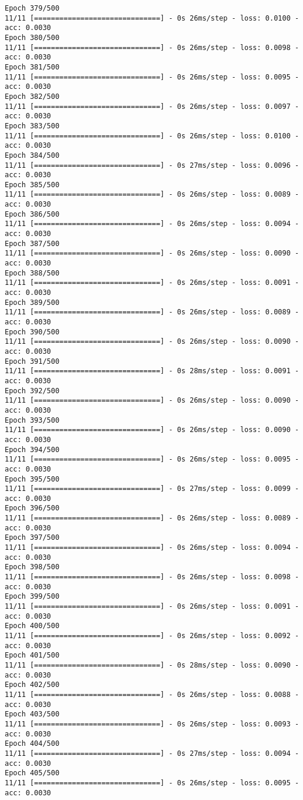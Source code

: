 \documentclass[11pt]{article}
\begin{document}
\begin{Verbatim}[commandchars=\\\{\}]
Epoch 379/500
11/11 [==============================] - 0s 26ms/step - loss: 0.0100 - acc: 0.0030
Epoch 380/500
11/11 [==============================] - 0s 26ms/step - loss: 0.0098 - acc: 0.0030
Epoch 381/500
11/11 [==============================] - 0s 26ms/step - loss: 0.0095 - acc: 0.0030
Epoch 382/500
11/11 [==============================] - 0s 26ms/step - loss: 0.0097 - acc: 0.0030
Epoch 383/500
11/11 [==============================] - 0s 26ms/step - loss: 0.0100 - acc: 0.0030
Epoch 384/500
11/11 [==============================] - 0s 27ms/step - loss: 0.0096 - acc: 0.0030
Epoch 385/500
11/11 [==============================] - 0s 26ms/step - loss: 0.0089 - acc: 0.0030
Epoch 386/500
11/11 [==============================] - 0s 26ms/step - loss: 0.0094 - acc: 0.0030
Epoch 387/500
11/11 [==============================] - 0s 26ms/step - loss: 0.0090 - acc: 0.0030
Epoch 388/500
11/11 [==============================] - 0s 26ms/step - loss: 0.0091 - acc: 0.0030
Epoch 389/500
11/11 [==============================] - 0s 26ms/step - loss: 0.0089 - acc: 0.0030
Epoch 390/500
11/11 [==============================] - 0s 26ms/step - loss: 0.0090 - acc: 0.0030
Epoch 391/500
11/11 [==============================] - 0s 28ms/step - loss: 0.0091 - acc: 0.0030
Epoch 392/500
11/11 [==============================] - 0s 26ms/step - loss: 0.0090 - acc: 0.0030
Epoch 393/500
11/11 [==============================] - 0s 26ms/step - loss: 0.0090 - acc: 0.0030
Epoch 394/500
11/11 [==============================] - 0s 26ms/step - loss: 0.0095 - acc: 0.0030
Epoch 395/500
11/11 [==============================] - 0s 27ms/step - loss: 0.0099 - acc: 0.0030
Epoch 396/500
11/11 [==============================] - 0s 26ms/step - loss: 0.0089 - acc: 0.0030
Epoch 397/500
11/11 [==============================] - 0s 26ms/step - loss: 0.0094 - acc: 0.0030
Epoch 398/500
11/11 [==============================] - 0s 26ms/step - loss: 0.0098 - acc: 0.0030
Epoch 399/500
11/11 [==============================] - 0s 26ms/step - loss: 0.0091 - acc: 0.0030
Epoch 400/500
11/11 [==============================] - 0s 26ms/step - loss: 0.0092 - acc: 0.0030
Epoch 401/500
11/11 [==============================] - 0s 28ms/step - loss: 0.0090 - acc: 0.0030
Epoch 402/500
11/11 [==============================] - 0s 26ms/step - loss: 0.0088 - acc: 0.0030
Epoch 403/500
11/11 [==============================] - 0s 26ms/step - loss: 0.0093 - acc: 0.0030
Epoch 404/500
11/11 [==============================] - 0s 27ms/step - loss: 0.0094 - acc: 0.0030
Epoch 405/500
11/11 [==============================] - 0s 26ms/step - loss: 0.0095 - acc: 0.0030

\end{Verbatim}
\end{document}
